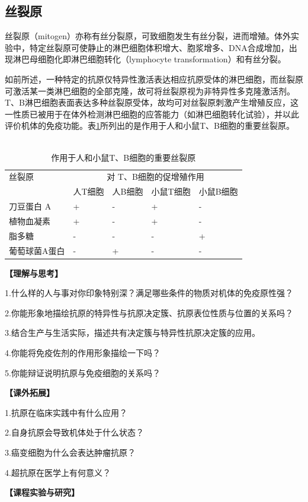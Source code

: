 \subsection{丝裂原}

丝裂原（mitogen）亦称有丝分裂原，可致细胞发生有丝分裂，进而增殖。体外实验中，特定丝裂原可使静止的淋巴细胞体积增大、胞浆增多、DNA合成增加，出现淋巴母细胞化即淋巴细胞转化（lymphocyte
transformation）和有丝分裂。

如前所述，一种特定的抗原仅特异性激活表达相应抗原受体的淋巴细胞，而丝裂原可激活某一类淋巴细胞的全部克隆，故可将丝裂原视为非特异性多克隆激活剂。T、B淋巴细胞表面表达多种丝裂原受体，故均可对丝裂原刺激产生增殖反应，这一性质已被用于在体外检测淋巴细胞的应答能力（如淋巴细胞转化试验），并以此评价机体的免疫功能。表\ref{tab3-2}所列出的是作用于人和小鼠T、B细胞的重要丝裂原。
　
\begin{longtable}[]{lllll}
    \caption{作用于人和小鼠T、B细胞的重要丝裂原}
    \label{tab3-2}\\
\toprule
丝裂原 & \multicolumn{4}{c}{对 T、B细胞的促增殖作用} \\
&人T细胞&人B细胞&小鼠T细胞&小鼠B细胞\\
\midrule
\endhead
刀豆蛋白 A&+&-&+&-\\
植物血凝素&+&-&+&-\\
脂多糖&-&-&-&+\\
葡萄球菌A蛋白&-&+&-&-\\
\bottomrule
\end{longtable}



\noindent\textbf{【理解与思考】}

1.什么样的人与事对你印象特别深？满足哪些条件的物质对机体的免疫原性强？

2.你能形象地描绘抗原的特异性与抗原决定簇、抗原表位性质与位置的关系吗？

3.结合生产与生活实际，描述共有决定簇与特异性抗原决定簇的应用。

4.你能将免疫佐剂的作用形象描绘一下吗？

5.你能辩证说明抗原与免疫细胞的关系吗？

\noindent\textbf{【课外拓展】}

1.抗原在临床实践中有什么应用？

2.自身抗原会导致机体处于什么状态？

3.癌变细胞为什么会表达肿瘤抗原？

4.超抗原在医学上有何意义？

\noindent\textbf{【课程实验与研究】}

